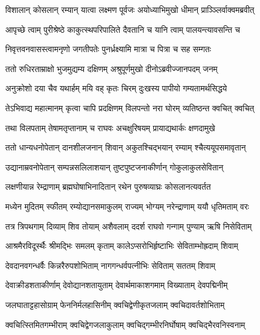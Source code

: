 
\twolineshloka
{विशालान् कोसलान् रम्यान् यात्वा लक्ष्मण पूर्वजः}
{अयोध्याभिमुखो धीमान् प्राञ्ञ्लिर्वाक्वमब्रवीत्} %

\twolineshloka
{आपृच्छे त्वाम् पुरीश्रेष्ठे काकुत्स्थपरिपालिते}
{दैवतानि च यानि त्वाम् पालयन्त्यावसन्ति च} %

\twolineshloka
{निवृत्तवनवासस्त्वामनृणो जगतीपतेः}
{पुनर्ध्रक्ष्यामि मात्रा च पित्रा च सह सम्गतः} %

\twolineshloka
{ततो रुधिरताम्राक्षो भुजमुद्यम्य दक्षिणम्}
{अश्रुपूर्णमुखो दीनोऽब्रवीज्जानपदम् जनम्} %

\twolineshloka
{अनुक्रोशो दया चैव यथार्हम् मयि वह् कृतः}
{चिरम् दुःखस्य पापीयो गम्यतामर्थसिद्धये} %

\twolineshloka
{तेऽभिवाद्य महात्मानम् कृत्वा चापि प्रदक्षिणम्}
{विलपन्तो नरा घोरम् व्यतिष्ठन्त क्वचित् क्वचित्} %

\twolineshloka
{तथा विलपताम् तेषामतृप्तानाम् च राघवः}
{अचक्षुरिषयम् प्रायाद्यथार्कः क्षणदामुखे} %

\twolineshloka
{ततो धान्यधनोपेतान् दानशीलजनान् शिवान्}
{अकुतश्चिद्भयान् रम्याम् श्चैत्ययूपसमावृतान्} %

\twolineshloka
{उद्यानाम्रवनोपेतान् सम्पन्नसलिलाशयान्}
{तुष्टपुष्टजनाकीर्णान् गोकुलाकुलसेवितान्} %

\twolineshloka
{लक्षणीयान्न रेम्द्राणाम् ब्रह्मघोषाभिनादितान्}
{रथेन पुरुषव्याघ्रः कोसलानत्यवर्तत} %

\twolineshloka
{मध्येन मुदितम् स्फीतम् रम्योद्यानसमाकुलम्}
{राज्यम् भोग्यम् नरेन्द्राणाम् ययौ धृतिमताम् वरः} %

\twolineshloka
{तत्र त्रिपथगाम् दिव्याम् शिव तोयाम् अशैवलाम्}
{ददर्श राघवो गन्गाम् पुण्याम् ऋषि निसेविताम्} %

\twolineshloka
{आश्रमैरविदूर्स्थैः श्रीमद्भिः समलम् कृताम्}
{कालेऽप्सरोभिर्हृष्टाभिः सेविताम्भोह्रदाम् शिवाम्} %

\twolineshloka
{देवदानवगन्धर्वैः किन्नरैरुपशोभिताम्}
{नागगन्धर्वपत्नीभिः सेविताम् सततम् शिवाम्} %

\twolineshloka
{देवाक्रीडशताकीर्णाम् देवोद्यानशतायुताम्}
{देवार्थमाकाशगमाम् विख्याताम् देवपद्मिनीम्} %

\twolineshloka
{जलघाताट्टहासोग्राम् फेननिर्मलहासिनीम्}
{क्वचिद्वेणीकृतजलाम् क्वचिदावर्तशोभिताम्} %

\twolineshloka
{क्वचित्स्तिमितगम्भीराम् क्वचिद्वेगजलाकुलाम्}
{क्वचिद्गम्भीरनिर्घोषाम् क्वचिद्भैरवनिस्वनाम्} %

